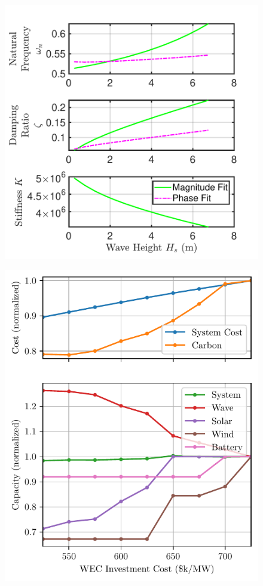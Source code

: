 \documentclass[10pt,twoside]{article}
\newif\ifplaceholder
\let\originalincludegraphics\includegraphics
\renewcommand{\includegraphics}[2][]{%
  \ifplaceholder
    \begin{tikzpicture}
      \node[anchor=south west, inner sep=0] (img) at (0,0) {\originalincludegraphics[#1]{#2}};
      \node at ($(img.south east)!0.5!(img.north west)$)
        [fill=white,opacity=0.8,text=red,font=\huge] {Placeholder};
    \end{tikzpicture}
    \vspace{-\baselineskip}
  \else
    \originalincludegraphics[#1]{#2}%
  \fi
  \placeholderfalse %
}
\begin{document}
\begin{figure}[b]
\noindent
\begin{minipage}[b]{0.565\textwidth}
    \centering
    \includegraphics[width=\linewidth]{figures/fit_wave_height_trend.pdf}
    \label{fig:fit-versus-wave-height}
\end{minipage}
\hfill
\begin{minipage}[b]{0.435\textwidth}
    \centering
    \includegraphics[width=\linewidth]{figures/CEM_cost_sweep.pdf}

\end{minipage}
\end{figure}
\end{document}
